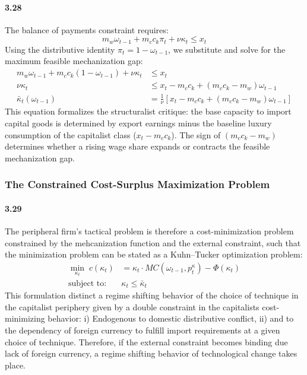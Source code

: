 \paragraph{3.28}
The balance of payments constraint requires:
\begin{equation}
	m_w \omega_{t-1} + m_c c_k \pi_t + \nu \kappa_t \le x_t
	\label{eq:33:bop_full}
\end{equation}
Using the distributive identity $\pi_t = 1 - \omega_{t-1}$,
we substitute and solve for the maximum feasible mechanization
gap:
\begin{align}
	m_w \omega_{t-1} + m_c c_k (1 - \omega_{t-1})
	+ \nu \kappa_t &\le x_t
	\label{eq:33:bop_sub} \\
	\nu \kappa_t &\le x_t - m_c c_k
	+ (m_c c_k - m_w) \omega_{t-1}
	\label{eq:33:bop_solved} \\
	\bar{\kappa}_t(\omega_{t-1})
	&= \frac{1}{\nu} \left[ x_t - m_c c_k
	+ (m_c c_k - m_w) \omega_{t-1} \right]
	\label{eq:33:kappa_bar}
\end{align}
This equation formalizes the structuralist critique: the base
capacity to import capital goods is determined by export
earnings minus the baseline luxury consumption of the
capitalist class ($x_t - m_c c_k$). The sign of
$(m_c c_k - m_w)$ determines whether a rising wage share
expands or contracts the feasible mechanization gap.

\subsubsection{The Constrained Cost-Surplus Maximization
	Problem}

\paragraph{3.29}
The peripheral firm's tactical problem is therefore a cost-minimization problem constrained by the mehcanization function and the external constraint, such that the minimization problem can be stated as a Kuhn–Tucker optimization problem: 
\begin{align}
	\min_{\kappa_t}\; c(\kappa_t)
	&=  \kappa_t \cdot MC(\omega_{t-1}, p^\kappa_t) - \Phi(\kappa_t)
	\label{eq:33:constrained_obj} \\
	\text{subject to:}\quad & \kappa_t \le \bar{\kappa}_t
	\label{eq:33:constraint}
\end{align}
This formulation distinct a regime shifting behavior of the choice of technique in the capitalist periphery given by a double constraint in the capitalists cost-minimizing behavior: i) Endogenous to domestic distributive conflict, ii) and to the dependency of foreign currency to fulfill import requirements at a given choice of technique. Therefore, if the external constraint becomes binding due lack of foreign currency, a regime shifting behavior of technological change takes place. 

